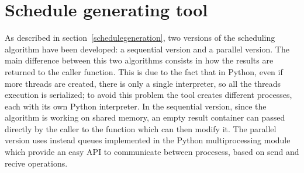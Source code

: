 \documentclass[a4paper,12pt,oneside]{book}
\begin{document}
\section{Schedule generating tool}

As described in section~\ref{schedulegeneration}, two versions of the scheduling algorithm have been developed: a sequential version and a parallel version. The main difference between this two algorithms consists in how the results are returned to the caller function. This is due to the fact that in Python, even if more threads are created, there is only a single interpreter, so all the threads execution is serialized; to avoid this problem the tool creates different processes, each with its own Python interpreter. In the sequential version, since the algorithm is working on shared memory, an empty result container can passed directly by the caller to the function which can then modify it. The parallel version uses instead queues implemented in the Python multiprocessing module which provide an easy API to communicate between procesess, based on send and recive operations. 
\end{document}
